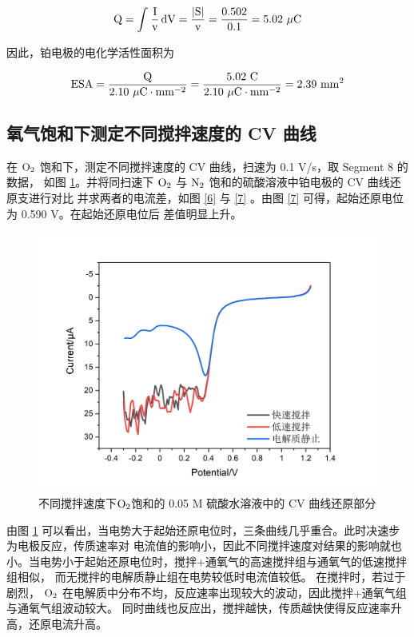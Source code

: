 \documentclass[cn,hazy,pku,12pt,normal,math=newtx,cite=super]{elegantnote}
\begin{document}
$$
\rm Q = \int_{}^{} \frac{I}{v} \,dV = \frac{|S|}{v} = \frac{0.502}{0.1} = 5.02\ \mu C 
$$

因此，铂电极的电化学活性面积为

$$
\rm ESA = \frac{Q}{2.10\ \mu C \cdot mm^{-2}} = \frac{5.02\ C}{2.10\ \mu C \cdot mm^{-2}} = 2.39\ mm^{2}
$$



\subsection{氧气饱和下测定不同搅拌速度的 CV 曲线}

在 $\rm O_2$ 饱和下，测定不同搅拌速度的 CV 曲线，扫速为 0.1 V/s，取 Segment 8 的数据，
如图 \ref{5}。并将同扫速下 $\rm O_2$ 与 $\rm N_2$ 饱和的硫酸溶液中铂电极的 CV 曲线还原支进行对比
并求两者的电流差，如图 \ref{6} 与  \ref{7} 。由图  \ref{7} 可得，起始还原电位为 0.590 V。在起始还原电位后
差值明显上升。

\begin{figure}[htbp]
    \centering
    \includegraphics[width = .70\textwidth]{image/Graph2.png}
    \caption{不同搅拌速度下$\rm O_2$饱和的 0.05 M 硫酸水溶液中的 CV 曲线还原部分}\label{5}
\end{figure}

由图 \ref{5} 可以看出，当电势大于起始还原电位时，三条曲线几乎重合。此时决速步为电极反应，传质速率对
电流值的影响小，因此不同搅拌速度对结果的影响就也小。当电势小于起始还原电位时，搅拌+通氧气的高速搅拌组与通氧气的低速搅拌组相似，
而无搅拌的电解质静止组在电势较低时电流值较低。
在搅拌时，若过于剧烈， $\rm O_2$ 在电解质中分布不均，反应速率出现较大的波动，因此搅拌+通氧气组与通氧气组波动较大。
同时曲线也反应出，搅拌越快，传质越快使得反应速率升高，还原电流升高。
\end{document}
